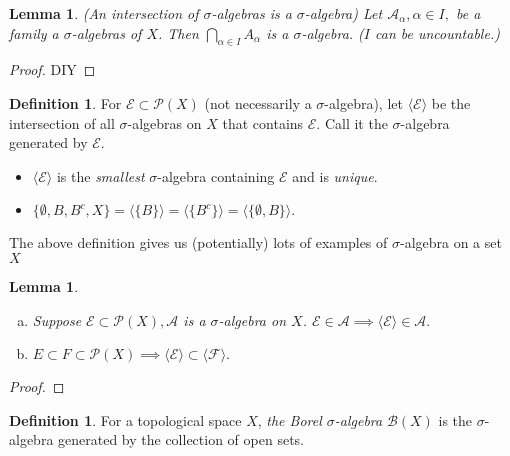 \documentclass{report}
\newtheorem{lemma}[theorem]{Lemma}
\theoremstyle{definition}
\newtheorem{definition}[theorem]{Definition}
\theoremstyle{remark}
\begin{document}
\begin{lemma}(An intersection of $\sigma$-algebras is a $\sigma$-algebra)
Let $\mathcal{A}_\alpha, \alpha \in I,$ be a family a $\sigma$-algebras of $X$. Then $\bigcap_{\alpha \in I} A_\alpha$ is a $\sigma$-algebra. ($I$ can be uncountable.)
\end{lemma}
\begin{proof}
DIY
\end{proof}

\begin{definition}
For $\mathcal{E} \subset \mathcal{P}(X)$ (not necessarily a $\sigma$-algebra), let $\langle \mathcal{E}\rangle$ be the intersection of all $\sigma$-algebras on $X$ that contains $\mathcal{E}.$ Call it the $\sigma$-algebra generated by $\mathcal{E}.$
\end{definition}
\begin{itemize}
\item $\langle \mathcal{E}\rangle$ is the \emph{smallest} $\sigma$-algebra containing $\mathcal{E}$ and is \emph{unique}.
\item $\{\emptyset, B, B^c, X\} = \langle \{B\} \rangle = \langle \{B^c\}\rangle = \langle \{\emptyset, B\}\rangle.$
\end{itemize}

The above definition gives us (potentially) lots of examples of $\sigma$-algebra on a set $X$

\begin{lemma}\label{le:alg}
\begin{enumerate}[(a)]
\item
	Suppose $\mathcal{E} \subset \mathcal{P}(X), \mathcal{A}$ is a $\sigma$-algebra on $X$. $\mathcal{E} \in \mathcal{A} \implies \langle\mathcal{E}\rangle \in \mathcal{A}.$
\item
	$E \subset F \subset \mathcal{P}(X) \implies \langle \mathcal{E} \rangle \subset \langle\mathcal{F}\rangle.$
\end{enumerate}
\end{lemma}
\begin{proof}

\end{proof}

\begin{definition}
For a topological space $X$, \emph{the Borel $\sigma$-algebra} $\mathcal{B}(X)$ is the $\sigma$-algebra generated by the collection of open sets.
\end{definition}
\end{document}
